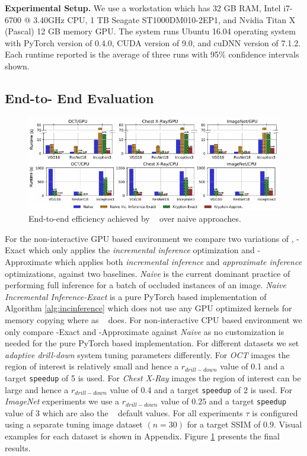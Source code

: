 \vspace{2mm}
\noindent \textbf{Experimental Setup.}
We use a workstation which has 32 GB RAM, Intel i7-6700 @ 3.40GHz CPU, 1 TB Seagate ST1000DM010-2EP1, and Nvidia Titan X (Pascal) 12 GB memory GPU.
The system runs Ubuntu 16.04 operating system with PyTorch version of 0.4.0, CUDA version of 9.0, and cuDNN version of 7.1.2.
Each runtime reported is the average of three runs with 95\% confidence intervals shown.

\subsection{End-to- End Evaluation}

\begin{figure}[t]
\includegraphics[width=\textwidth]{images/5_1_all_edited_b}
\caption{End-to-end efficiency achieved by \system~ over naive approaches.}
\label{fig:5_1_all_edited}
\end{figure}

For the non-interactive GPU based environment we compare two variations of \system, \system-Exact which only applies the \textit{incremental inference} optimization and \system-Approximate which applies both \textit{incremental inference} and \textit{approximate inference} optimizations, against two baselines.
\textit{Naive} is the current dominant practice of performing full inference for a batch of occluded instances of an image.
\textit{Naive Incremental Inference-Exact} is a pure PyTorch based implementation of Algorithm \ref{alg:incinference} which does not use any GPU optimized kernels for memory copying where as \system~ does.
For non-interactive CPU based environment we only compare \system-Exact and \system-Approximate against \textit{Naive} as no customization is needed for the pure PyTorch based implementation.
For different datasets we set \textit{adaptive drill-down} system tuning parameters differently.
For \textit{OCT} images the region of interest is relatively small and hence a $r_{drill-down}$ value of 0.1 and a target \texttt{speedup} of 5 is used.
For \textit{Chest X-Ray} images the region of interest can be large and hence a $r_{drill-down}$ value of 0.4 and a target \texttt{speedup} of 2 is used.
For \textit{ImageNet} experiments we use a $r_{drill-down}$ value of $0.25$ and a target \texttt{speedup} value of 3 which are also the \system~ default values.
For all experiments $\tau$ is configured using a separate tuning image dataset $(n=30)$ for a target SSIM of $0.9$.
Visual examples for each dataset is shown in Appendix.
Figure \ref{fig:5_1_all_edited} presents the final results.

